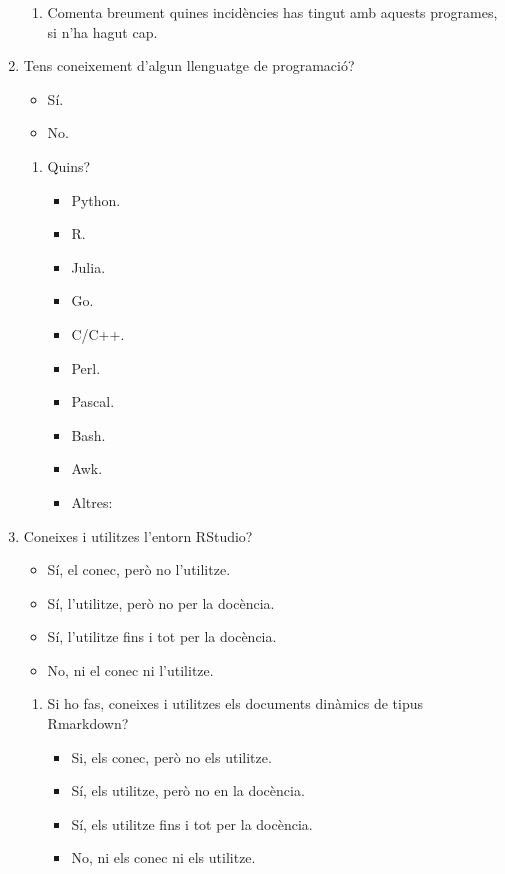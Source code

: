 \documentclass[a4paper,12pt]{article}
\begin{document}
\begin{enumerate}
\begin{enumerate}
   \item Comenta breument quines incidències has tingut amb aquests programes, si n'ha hagut cap.
   \vspace*{1cm}
   \end{enumerate}

\item Tens coneixement d'algun llenguatge de programació?
   \begin{itemize}
   \item Sí.
   \item No.
   \end{itemize}

   \begin{enumerate}
   \item Quins?
      \begin{itemize}
      \item Python.
      \item R.
      \item Julia.
      \item Go.
      \item C/C++.
      \item Perl.
      \item Pascal.
      \item Bash.
      \item Awk.
      \item Altres:
      \end{itemize}
   \end{enumerate}

\item Coneixes i utilitzes l'entorn RStudio? \cite{RStudio}
   \begin{itemize}
   \item Sí, el conec, però no l'utilitze.
   \item Sí, l'utilitze, però no per la docència.
   \item Sí, l'utilitze fins i tot per la docència.
   \item No, ni el conec ni l'utilitze.
   \end{itemize}

   \begin{enumerate}
   \item Si ho fas, coneixes i utilitzes els documents dinàmics de tipus Rmarkdown?
      \begin{itemize}
      \item Si, els conec, però no els utilitze.
      \item Sí, els utilitze, però no en la docència.
      \item Sí, els utilitze fins i tot per la docència.
      \item No, ni els conec ni els utilitze.
      \end{itemize}


\end{enumerate}
\end{enumerate}
\end{document}
